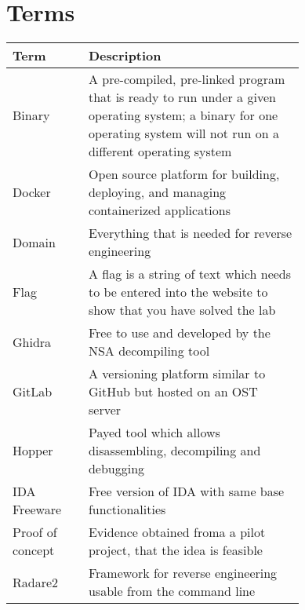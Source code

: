 \section*{Terms}
\begin{table}[H]
    \begin{tabular}{|lp{0.744\linewidth}|}
    \hline
    \textbf{Term} & \textbf{Description}\\
    \hline
    \hline
    Binary           & A pre-compiled, pre-linked program that is ready to run under a given operating system; a binary for one operating system will not run on a different operating system         \\
    Docker           & Open source platform for building, deploying, and managing containerized applications         \\
    Domain           & Everything that is needed for reverse engineering         \\
    Flag             & A flag is a string of text which needs to be entered into the website to show that you have solved the lab         \\
    Ghidra           & Free to use and developed by the NSA decompiling tool         \\
    GitLab           & A versioning platform similar to GitHub but hosted on an OST server \\
    Hopper           & Payed tool which allows disassembling, decompiling and debugging         \\
    IDA Freeware     & Free version of IDA with same base functionalities        \\
    Proof of concept & Evidence obtained froma a pilot project, that the idea is feasible         \\
    Radare2          & Framework for reverse engineering usable from the command line         \\
    \hline
    \end{tabular}
\end{table}
